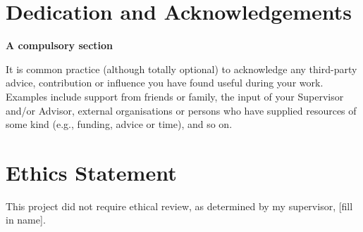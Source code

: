 \documentclass[ oneside,%
                    author={James Elgar},
                    degree={MEng},
                     title={Bidirectional transformer between functional and \\ object-oriented programming in Rust},
                  subtitle={}]{dissertation}
\begin{document}


\chapter*{Dedication and Acknowledgements}

{\bf A compulsory section}
\vspace{1cm} 

\noindent
It is common practice (although totally optional) to acknowledge any
third-party advice, contribution or influence you have found useful
during your work.  Examples include support from friends or family, 
the input of your Supervisor and/or Advisor, external organisations 
or persons who  have supplied resources of some kind (e.g., funding, 
advice or time), and so on.



\makedecl





\tableofcontents
\listoffigures
\listoftables




\chapter*{Ethics Statement}

This project did not require ethical review, as determined by my supervisor, [fill in name].


\end{document}
